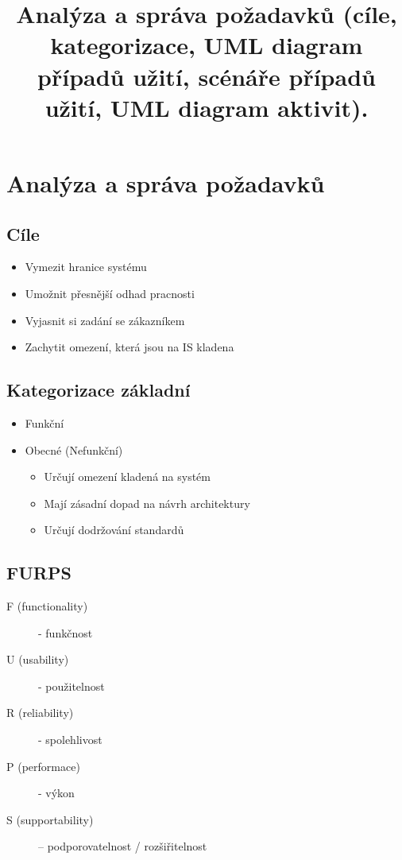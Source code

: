 \documentclass{szzclass}
\title{Analýza a správa požadavků (cíle, kategorizace, UML diagram případů užití, scénáře případů užití, UML diagram aktivit).}
\begin{document}
\maketitle
\tableofcontents
\newpage

\section{Analýza a správa požadavků}
\subsection{Cíle}
\begin{itemize}
\item Vymezit hranice systému
\item Umožnit přesnější odhad pracnosti
\item Vyjasnit si zadání se zákazníkem
\item Zachytit omezení, která jsou na IS kladena
\end{itemize}

\subsection{Kategorizace základní}
\begin{itemize}
\item Funkční
\item Obecné (Nefunkční)
  \begin{itemize}
  \item Určují omezení kladená na systém
  \item Mají zásadní dopad na návrh architektury
  \item Určují dodržování standardů
  \end{itemize}
\end{itemize}

\subsection{FURPS}
\begin{description}
\item[F (functionality)] - funkčnost
\item[U (usability)] - použitelnost
\item[R (reliability)] - spolehlivost
\item[P (performace)] - výkon
\item[S (supportability)] – podporovatelnost / rozšiřitelnost
\end{description}
\end{document}
